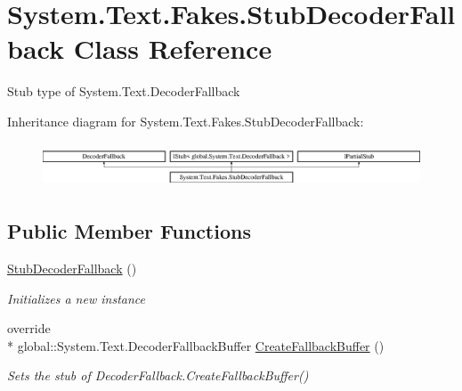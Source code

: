 \hypertarget{class_system_1_1_text_1_1_fakes_1_1_stub_decoder_fallback}{\section{System.\-Text.\-Fakes.\-Stub\-Decoder\-Fallback Class Reference}
\label{class_system_1_1_text_1_1_fakes_1_1_stub_decoder_fallback}
}


Stub type of System.\-Text.\-Decoder\-Fallback 


Inheritance diagram for System.\-Text.\-Fakes.\-Stub\-Decoder\-Fallback\-:\begin{figure}[H]
\begin{center}
\leavevmode
\includegraphics[height=1.342926cm]{class_system_1_1_text_1_1_fakes_1_1_stub_decoder_fallback}
\end{center}
\end{figure}
\subsection*{Public Member Functions}
\begin{DoxyCompactItemize}
\item 
\hyperlink{class_system_1_1_text_1_1_fakes_1_1_stub_decoder_fallback_a2587ced27d37e429994390c5ef3d910d}{Stub\-Decoder\-Fallback} ()
\begin{DoxyCompactList}\small\item\em Initializes a new instance\end{DoxyCompactList}\item 
override \\*
global\-::\-System.\-Text.\-Decoder\-Fallback\-Buffer \hyperlink{class_system_1_1_text_1_1_fakes_1_1_stub_decoder_fallback_a1672c4cd05bdd98a7772012e1d490f18}{Create\-Fallback\-Buffer} ()
\begin{DoxyCompactList}\small\item\em Sets the stub of Decoder\-Fallback.\-Create\-Fallback\-Buffer()\end{DoxyCompactList}\end{DoxyCompactItemize}
